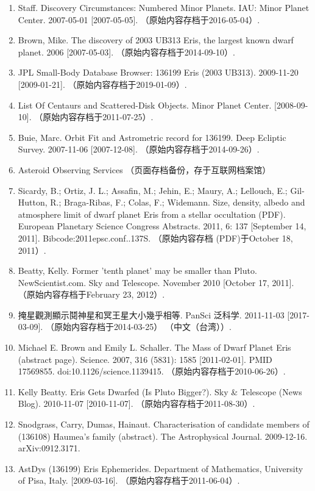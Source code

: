 \begin{enumerate}
\item Staff. Discovery Circumstances: Numbered Minor Planets. IAU: Minor Planet Center. 2007-05-01 [2007-05-05]. （原始内容存档于2016-05-04）.
\item Brown, Mike. The discovery of 2003 UB313 Eris, the largest known dwarf planet. 2006 [2007-05-03]. （原始内容存档于2014-09-10）.
\item JPL Small-Body Database Browser: 136199 Eris (2003 UB313). 2009-11-20 [2009-01-21]. （原始内容存档于2019-01-09）.
\item List Of Centaurs and Scattered-Disk Objects. Minor Planet Center. [2008-09-10]. （原始内容存档于2011-07-25）.
\item Buie, Marc. Orbit Fit and Astrometric record for 136199. Deep Ecliptic Survey. 2007-11-06 [2007-12-08]. （原始内容存档于2014-09-26）.
\item Asteroid Observing Services （页面存档备份，存于互联网档案馆）
\item Sicardy, B.; Ortiz, J. L.; Assafin, M.; Jehin, E.; Maury, A.; Lellouch, E.; Gil-Hutton, R.; Braga-Ribas, F.; Colas, F.; Widemann. Size, density, albedo and atmosphere limit of dwarf planet Eris from a stellar occultation (PDF). European Planetary Science Congress Abstracts. 2011, 6: 137 [September 14, 2011]. Bibcode:2011epsc.conf..137S. （原始内容存档 (PDF)于October 18, 2011）.
\item Beatty, Kelly. Former 'tenth planet' may be smaller than Pluto. NewScientist.com. Sky and Telescope. November 2010 [October 17, 2011]. （原始内容存档于February 23, 2012）.
\item 掩星觀測顯示鬩神星和冥王星大小幾乎相等. PanSci 泛科学. 2011-11-03 [2017-03-09]. （原始内容存档于2014-03-25） （中文（台湾））.
\item Michael E. Brown and Emily L. Schaller. The Mass of Dwarf Planet Eris (abstract page). Science. 2007, 316 (5831): 1585 [2011-02-01]. PMID 17569855. doi:10.1126/science.1139415. （原始内容存档于2010-06-26）.
\item Kelly Beatty. Eris Gets Dwarfed (Is Pluto Bigger?). Sky & Telescope (News Blog). 2010-11-07 [2010-11-07]. （原始内容存档于2011-08-30）.
\item Snodgrass, Carry, Dumas, Hainaut. Characterisation of candidate members of (136108) Haumea's family (abstract). The Astrophysical Journal. 2009-12-16. arXiv:0912.3171.
\item AstDys (136199) Eris Ephemerides. Department of Mathematics, University of Pisa, Italy. [2009-03-16]. （原始内容存档于2011-06-04）.

\end{enumerate}
